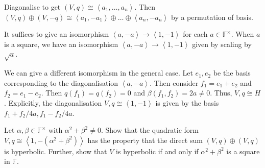 \documentclass[12 pt, letterpaper]{hmcpset}
\begin{document}
\begin{solution}
	Diagonalise to get $(V, q) \cong \left < a_{1}, \dots, a_{n} \right >$. Then $(V, q) \oplus (V, -q) \cong \left < a_{1}, -a_{1} \right > \oplus \dots \oplus \left < a_{n}, -a_{n} \right >$ by a permutation of basis.

	It suffices to give an isomorphism $\left < a, -a \right > \to \left < 1, -1 \right >$ for each $a \in \mathbb{F}^{\times}$. When $a$ is a square, we have an isomorphism $\left < a, -a \right > \to \left < 1, -1 \right >$ given by scaling by $\sqrt{a}$. 

	We can give a different isomorphism in the general case. Let $e_{1}, e_{2}$ be the basis corresponding to the diagonalisation  $\left < a, -a \right >$. Then consider $f_{1} = e_{1} + e_{2}$ and $f_{2} = e_{1} - e_{2}$. Then $q(f_{1}) = q(f_{2}) = 0$ and $\beta(f_{1}, f_{2}) = 2a \neq 0$. Thus, $V, q \cong H$. Explicitly, the diagonalisation  $V, q \cong \left < 1, -1 \right >$ is given by the basis $f_{1} + f_{2} / 4a, f_{1} - f_{2} / 4a$.
\end{solution}

\pagebreak

\begin{problem}[(4)]
	Let $\alpha, \beta \in \mathbb{F}^{\times}$ with $\alpha^{2} + \beta^{2} \neq 0$. Show that the quadratic form $V, q \cong \left < 1, -(\alpha^{2} + \beta^{2}) \right >$ has the property that the direct sum $(V, q) \oplus (V, q)$ is hyperbolic. Further, show that $V$ is hyperbolic if and only if $\alpha^{2} + \beta^{2}$ is a square in $\mathbb{F}$.
\end{problem}
\end{document}
